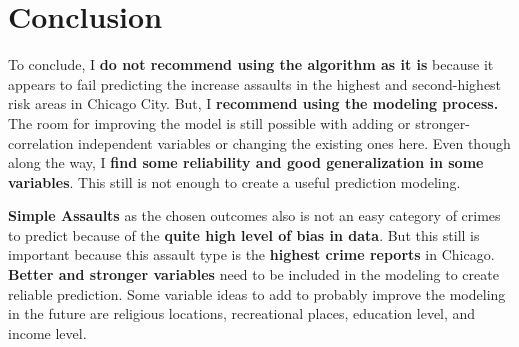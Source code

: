 \documentclass[
]{article}
\begin{document}
\section{Conclusion}\label{conclusion}

To conclude, I \textbf{do not recommend using the algorithm as it is}
because it appears to fail predicting the increase assaults in the
highest and second-highest risk areas in Chicago City. But, I
\textbf{recommend using the modeling process.} The room for improving
the model is still possible with adding or stronger-correlation
independent variables or changing the existing ones here. Even though
along the way, I \textbf{find some reliability and good generalization
in some variables}. This still is not enough to create a useful
prediction modeling.

\textbf{Simple Assaults} as the chosen outcomes also is not an easy
category of crimes to predict because of the \textbf{quite high level of
bias in data}. But this still is important because this assault type is
the \textbf{highest crime reports} in Chicago. \textbf{Better and
stronger variables} need to be included in the modeling to create
reliable prediction. Some variable ideas to add to probably improve the
modeling in the future are religious locations, recreational places,
education level, and income level.
\end{document}
